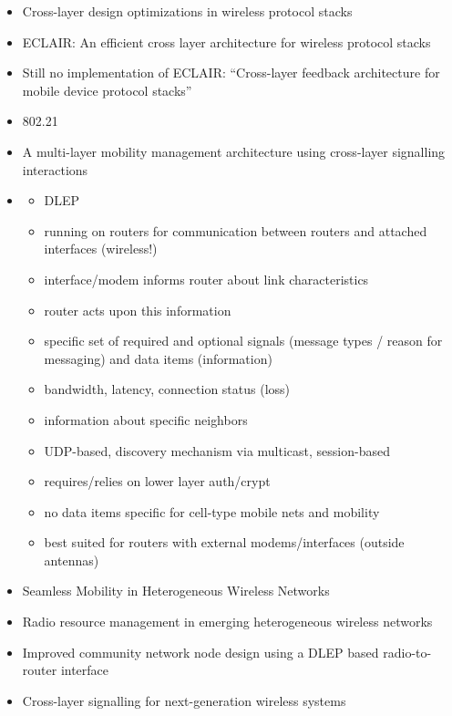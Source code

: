 \begin{itemize}
	\item Cross-layer design optimizations in wireless protocol stacks \cite{Raisinghani2004720}
	\item ECLAIR: An efficient cross layer architecture for wireless protocol stacks \cite{raisinghani2004eclair}
	\item Still no implementation of ECLAIR: ``Cross-layer feedback architecture for mobile device protocol stacks'' \cite{1580937}
	\item 802.21
	\item A multi-layer mobility management architecture using cross-layer signalling interactions\cite{wang2003multi}
	\item 
		\begin{itemize}
			\item \gls{DLEP} \cite{ietf2013dlepdraft}
			\item running on routers for communication between routers and attached interfaces (wireless!)
			\item interface/modem informs router about link characteristics
			\item router acts upon this information
			\item specific set of required and optional signals (message types / reason for messaging) and data items (information)
			\item bandwidth, latency, connection status (loss)
			\item information about specific neighbors
			\item \gls{UDP}-based, discovery mechanism via multicast, session-based
			\item requires/relies on lower layer auth/crypt
			\item no data items specific for cell-type mobile nets and mobility
			\item best suited for routers with external modems/interfaces (outside antennas)
		\end{itemize}
	\item Seamless Mobility in Heterogeneous Wireless Networks \cite{zarai2010seamless}
	\item Radio resource management in emerging heterogeneous wireless networks \cite{Piamrat20111066}
	\item Improved community network node design using a DLEP based radio-to-router interface \cite{6379143}
	\item Cross-layer signalling for next-generation wireless systems \cite{1200522}

\end{itemize}
